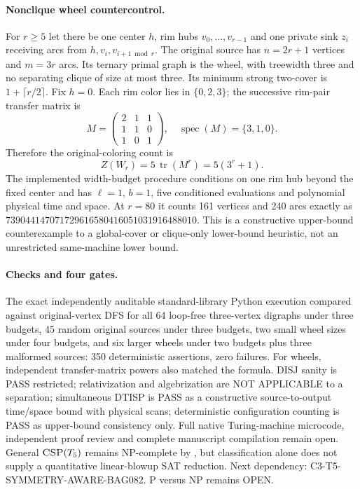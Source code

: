\documentclass[11pt]{article}
\begin{document}
\paragraph{Nonclique wheel countercontrol.}
For $r\ge5$ let there be one center $h$, rim hubs
$v_0,\ldots,v_{r-1}$ and one private sink $z_i$ receiving
arcs from $h,v_i,v_{i+1\bmod r}$. The original source has
$n=2r+1$ vertices and $m=3r$ arcs. Its ternary primal
graph is the wheel, with treewidth three and no separating
clique of size at most three. Its minimum strong two-cover
is $1+\lceil r/2\rceil$.
Fix $h=0$. Each rim color lies in $\{0,2,3\}$; the
successive rim-pair transfer matrix is
\[
M=\begin{pmatrix}2&1&1\\1&1&0\\1&0&1\end{pmatrix},
\quad \operatorname{spec}(M)=\{3,1,0\}.
\]
Therefore the original-coloring count is
\[
\boxed{Z(W_r)=5\,\operatorname{tr}(M^r)=5(3^r+1).}
\]
The implemented width-budget procedure conditions on
one rim hub beyond the fixed center and has
$\ell=1$, $b=1$, five conditioned evaluations and
polynomial physical time and space. At $r=80$ it counts
161 vertices and 240 arcs exactly as
$739044147071729616580416051031916488010$.
This is a constructive upper-bound counterexample to a
global-cover or clique-only lower-bound heuristic,
not an unrestricted same-machine lower bound.

\paragraph{Checks and four gates.}
The exact independently auditable standard-library Python
execution compared against original-vertex DFS for all
64 loop-free three-vertex digraphs under three budgets,
45 random original sources under three budgets,
two small wheel sizes under four budgets, and six
larger wheels under two budgets plus three malformed
sources: 350 deterministic assertions, zero failures.
For wheels, independent transfer-matrix powers also matched
the formula. DISJ sanity is PASS restricted; relativization
and algebrization are NOT APPLICABLE to a separation;
simultaneous DTISP is PASS as a constructive source-to-output
time/space bound with physical scans; deterministic
configuration counting is PASS as upper-bound consistency
only. Full native Turing-machine microcode, independent proof
review and complete manuscript compilation remain open.
General $\textsc{CSP}(T_5)$ remains NP-complete by
\cite{BangJensenHellMacGillivray1988}, but classification alone
does not supply a quantitative linear-blowup SAT reduction.
Next dependency: \textsc{C3-T5-SYMMETRY-AWARE-BAG082}.
P versus NP remains OPEN.
\end{document}

